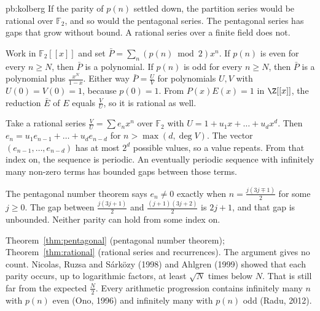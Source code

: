\begin{solution}{pb:kolberg}
\idea If the parity of $p(n)$ settled down, the partition series would be rational over $\mathbb F_2$, and so would the pentagonal series. The pentagonal series has gaps that grow without bound. A rational series over a finite field does not.

\writeup Work in $\mathbb F_2[[x]]$ and set $\bar P=\sum_n(p(n)\bmod2)x^n$. If $p(n)$ is even for every $n\ge N$, then $\bar P$ is a polynomial.
If $p(n)$ is odd for every $n\ge N$, then $\bar P$ is a polynomial plus $\frac{x^N}{1-x}$. Either way $\bar P=\frac UV$ for polynomials
$U,V$ with $U(0)=V(0)=1$, because $p(0)=1$. From $P(x)E(x)=1$ in $\Z[[x]]$, the reduction $\bar E$ of $E$ equals $\frac VU$, so it is rational as well.

Take a rational series $\frac VU=\sum e_nx^n$ over $\mathbb F_2$ with $U=1+u_1x+\dots+u_dx^d$. Then $e_n=u_1e_{n-1}+\dots+u_de_{n-d}$ for
$n>\max(d,\deg V)$. The vector $(e_{n-1},\dots,e_{n-d})$ has at most $2^d$ possible values, so a value repeats. From that index on, the sequence
is periodic. An eventually periodic sequence with infinitely many non-zero terms has bounded gaps between those terms.

The pentagonal number theorem says $e_n\ne0$ exactly when $n=\frac{j(3j\mp1)}2$ for some $j\ge0$. The gap between
$\frac{j(3j+1)}2$ and $\frac{(j+1)(3j+2)}2$ is $2j+1$, and that gap is unbounded. Neither parity can hold from some index on.

\tools Theorem~\ref{thm:pentagonal} (pentagonal number theorem); Theorem~\ref{thm:rational} (rational series and recurrences).
\leads The argument gives no count. Nicolas, Ruzsa and Sárközy (1998) and Ahlgren (1999) showed that each
parity occurs, up to logarithmic factors, at least $\sqrt N$ times below $N$. That is still far from the expected $\frac N2$. Every arithmetic
progression contains infinitely many $n$ with $p(n)$ even (Ono, 1996) and infinitely many with $p(n)$ odd (Radu, 2012).
\end{solution}

